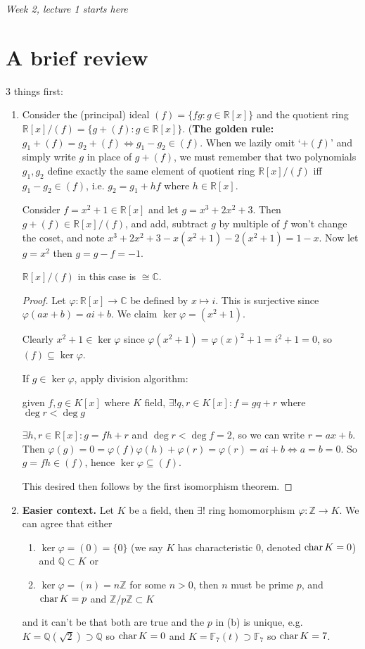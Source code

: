 \documentclass[a4paper]{article}
\newcommand{\Z}{\mathbb Z}
\newcommand{\Q}{\mathbb Q}
\newcommand{\C}{\mathbb C}
\newcommand{\R}{\mathbb R}
\newcommand{\Char}{\text{char\,}}
\theoremstyle{definition}
\begin{document}
\begin{flushright}
\textit{Week 2, lecture 1 starts here}
\end{flushright}

\section{A brief review}
3 things first:
\begin{enumerate}
\item Consider the (principal) ideal $(f)=\{fg:g\in\R[x]\}$ and the quotient ring $\R[x]/(f)=\{g+(f):g\in\R[x]\}$. (\textbf{The golden rule:} $g_1+(f)=g_2+(f)\Leftrightarrow g_1-g_2\in (f)$. When we lazily omit `$+(f)$' and simply write $g$ in place of $g+(f)$, we must remember that two polynomials $g_1,g_2$ define exactly the same element of quotient ring $\R[x]/(f)$ iff $g_1-g_2\in (f)$, i.e. $g_2=g_1+hf$ where $h\in \R[x]$.

Consider $f=x^2+1\in\R[x]$ and let $g=x^3+2x^2+3$. Then $g+(f)\in\R[x]/(f)$, and add, subtract $g$ by multiple of $f$ won't change the coset, and note $x^3+2x^2+3-x(x^2+1)-2(x^2+1)=1-x$. Now let $g=x^2$ then $g=g-f=-1$.

$\R[x]/(f)$ in this case is $\cong \C$.
\begin{proof}
Let $\varphi:\R[x]\rightarrow \C$ be defined by $x\mapsto i$. This is surjective since $\varphi(ax+b)=ai+b$. We claim $\ker \varphi =(x^2+1)$.

Clearly $x^2+1\in\ker\varphi$ since $\varphi(x^2+1)=\varphi(x)^2+1=i^2+1=0$, so $(f)\subseteq \ker\varphi$.

If $g\in\ker\varphi$, apply division algorithm:
\begin{flushright}
given $f,g\in K[x]$ where $K$ field, $\exists! q,r\in K[x]:f=gq+r$ where $\deg r<\deg g$
\end{flushright}
$\exists h,r\in\R[x]:g=fh+r$ and $\deg r<\deg f=2$, so we can write $r=ax+b$. Then $\varphi(g)=0=\varphi(f)\varphi(h)+\varphi(r)=\varphi(r)=ai+b \Leftrightarrow a=b=0$. So $g=fh\in (f)$, hence $\ker\varphi \subseteq (f)$.

This desired then follows by the first isomorphism theorem.
\end{proof}

\item \textbf{Easier context.} Let $K$ be a field, then $\exists!$ ring homomorphism $\varphi:\Z\rightarrow K$. We can agree that either
\begin{enumerate}
\item $\ker \varphi=(0)=\{0\}$ (we say $K$ has characteristic 0, denoted $\Char K=0$) and $\Q\subset K$ or
\item $\ker\varphi =(n)=n\Z$ for some $n>0$, then $n$ must be prime $p$, and $\Char K=p$ and $\Z/p\Z \subset K$
\end{enumerate}
and it can't be that both are true and the $p$ in (b) is unique, e.g. $K=\Q(\sqrt 2)\supset \Q$ so $\Char K=0$ and $K=\mathbb F_7(t)\supset \mathbb F_7$ so $\Char K=7$.


\end{enumerate}
\end{document}
